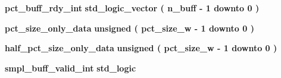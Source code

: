 \begin{DoxyCompactItemize}
\item 
{\bf pct\+\_\+buff\+\_\+rdy\+\_\+int} {\bfseries \textcolor{comment}{std\+\_\+logic\+\_\+vector}\textcolor{vhdlchar}{ }\textcolor{vhdlchar}{(}\textcolor{vhdlchar}{ }\textcolor{vhdlchar}{ }\textcolor{vhdlchar}{ }\textcolor{vhdlchar}{ }{\bfseries {\bf n\+\_\+buff}} \textcolor{vhdlchar}{-\/}\textcolor{vhdlchar}{ } \textcolor{vhdldigit}{1} \textcolor{vhdlchar}{ }\textcolor{keywordflow}{downto}\textcolor{vhdlchar}{ }\textcolor{vhdlchar}{ } \textcolor{vhdldigit}{0} \textcolor{vhdlchar}{ }\textcolor{vhdlchar}{)}\textcolor{vhdlchar}{ }} 
\item 
{\bf pct\+\_\+size\+\_\+only\+\_\+data} {\bfseries \textcolor{comment}{unsigned}\textcolor{vhdlchar}{ }\textcolor{vhdlchar}{(}\textcolor{vhdlchar}{ }\textcolor{vhdlchar}{ }\textcolor{vhdlchar}{ }\textcolor{vhdlchar}{ }{\bfseries {\bf pct\+\_\+size\+\_\+w}} \textcolor{vhdlchar}{-\/}\textcolor{vhdlchar}{ } \textcolor{vhdldigit}{1} \textcolor{vhdlchar}{ }\textcolor{keywordflow}{downto}\textcolor{vhdlchar}{ }\textcolor{vhdlchar}{ } \textcolor{vhdldigit}{0} \textcolor{vhdlchar}{ }\textcolor{vhdlchar}{)}\textcolor{vhdlchar}{ }} 
\item 
{\bf half\+\_\+pct\+\_\+size\+\_\+only\+\_\+data} {\bfseries \textcolor{comment}{unsigned}\textcolor{vhdlchar}{ }\textcolor{vhdlchar}{(}\textcolor{vhdlchar}{ }\textcolor{vhdlchar}{ }\textcolor{vhdlchar}{ }\textcolor{vhdlchar}{ }{\bfseries {\bf pct\+\_\+size\+\_\+w}} \textcolor{vhdlchar}{-\/}\textcolor{vhdlchar}{ } \textcolor{vhdldigit}{1} \textcolor{vhdlchar}{ }\textcolor{keywordflow}{downto}\textcolor{vhdlchar}{ }\textcolor{vhdlchar}{ } \textcolor{vhdldigit}{0} \textcolor{vhdlchar}{ }\textcolor{vhdlchar}{)}\textcolor{vhdlchar}{ }} 
\item 
{\bf smpl\+\_\+buff\+\_\+valid\+\_\+int} {\bfseries \textcolor{comment}{std\+\_\+logic}\textcolor{vhdlchar}{ }} 
\end{DoxyCompactItemize}
